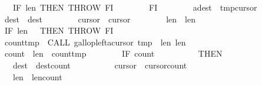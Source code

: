 \begin{isabellebody}
\ \ \ \ \ \ \ \ \ \ IF\ {\isasymacute}len{}{\isacharequal}{}\ THEN\ THROW\ FI\isanewline
\ \ \ \ \ \ \ \ FI{\isacharsemicolon}{\isacharsemicolon}\isanewline
\ \ \ \ \ \ \ \ {\isasymacute}a{\isacharbang}{\isasymacute}dest\ {\isacharcolon}{\isacharequal}{\isacharequal}\ {\isasymacute}tmp{\isacharbang}{\isasymacute}cursor{}{\isacharsemicolon}{\isacharsemicolon}\isanewline
\ \ \ \ \ \ \ \ {\isasymacute}dest\ {\isacharcolon}{\isacharequal}{\isacharequal}\ {\isasymacute}dest{\isacharminus}{}{\isacharsemicolon}{\isacharsemicolon}\isanewline
\ \ \ \ \ \ \ \ {\isasymacute}cursor{}\ {\isacharcolon}{\isacharequal}{\isacharequal}\ {\isasymacute}cursor{}{\isacharminus}{}{\isacharsemicolon}{\isacharsemicolon}\isanewline
\ \ \ \ \ \ \ \ {\isasymacute}len{}\ {\isacharcolon}{\isacharequal}{\isacharequal}\ {\isasymacute}len{}{\isacharminus}{}{\isacharsemicolon}{\isacharsemicolon}\isanewline
\ \ \ \ \ \ \ \ IF\ {\isasymacute}len{}\ {\isacharequal}\ {}\ THEN\ THROW\ FI{\isacharsemicolon}{\isacharsemicolon}\isanewline
\isanewline
\ \ \ \ \ \ \ \ {\isasymacute}count{\isacharunderscore}tmp\ {\isacharcolon}{\isacharequal}{\isacharequal}\ CALL\ gallop{\isacharunderscore}left{\isacharparenleft}{\isasymacute}a{\isacharbang}{\isasymacute}cursor{}{\isacharcomma}\ {\isasymacute}tmp{\isacharcomma}\ {}{\isacharcomma}\ {\isasymacute}len{}{\isacharcomma}\ {\isacharparenleft}{\isasymacute}len{}{\isacharminus}{}{\isacharparenright}{\isacharparenright}{\isacharsemicolon}{\isacharsemicolon}\isanewline
\ \ \ \ \ \ \ \ {\isasymacute}count{}\ {\isacharcolon}{\isacharequal}{\isacharequal}\ {\isasymacute}len{}\ {\isacharminus}\ {\isasymacute}count{\isacharunderscore}tmp{\isacharsemicolon}{\isacharsemicolon}\isanewline
\ \ \ \ \ \ \ \ IF\ {\isasymacute}count{}\ {\isasymnoteq}\ {}\isanewline
\ \ \ \ \ \ \ \ THEN\isanewline
\ \ \ \ \ \ \ \ \ \ {\isasymacute}dest\ {\isacharcolon}{\isacharequal}{\isacharequal}\ {\isasymacute}dest{\isacharminus}{\isasymacute}count{}{\isacharsemicolon}{\isacharsemicolon}\isanewline
\ \ \ \ \ \ \ \ \ \ {\isasymacute}cursor{}\ {\isacharcolon}{\isacharequal}{\isacharequal}\ {\isasymacute}cursor{}{\isacharminus}{\isasymacute}count{}{\isacharsemicolon}{\isacharsemicolon}\isanewline
\ \ \ \ \ \ \ \ \ \ {\isasymacute}len{}\ {\isacharcolon}{\isacharequal}{\isacharequal}\ {\isasymacute}len{}{\isacharminus}{\isasymacute}count{}{\isacharsemicolon}{\isacharsemicolon}\isanewline

\end{isabellebody}
